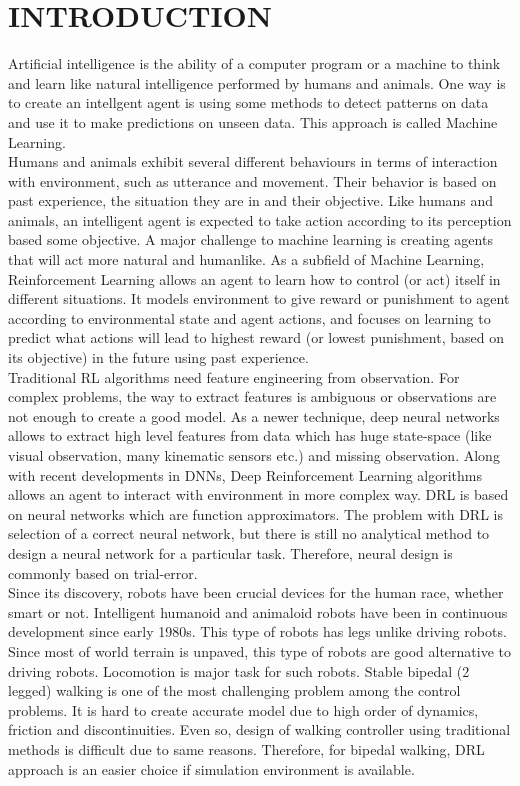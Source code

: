 \chapter{INTRODUCTION}
\label{chap:intro}
Artificial intelligence is the ability of a computer program or a machine to think and learn like natural intelligence performed by humans and animals.  One way is to create an intellgent agent is using some methods to detect patterns on data and use it to make predictions on unseen data. This approach is called Machine Learning.  \\
Humans and animals exhibit several different behaviours in terms of interaction with environment, such as utterance and movement. Their behavior is based on past experience, the situation they are in and their objective. Like humans and animals, an intelligent agent is expected to take action according to its perception based some objective. A major challenge to machine learning is creating agents that will act more natural and humanlike. As a subfield of Machine Learning, Reinforcement Learning allows an agent to learn how to control (or act) itself in different situations. It models environment to give reward or punishment to agent according to environmental state and agent actions, and focuses on learning to predict what actions will lead to highest reward (or lowest punishment, based on its objective) in the future using past experience. \\
Traditional RL algorithms need feature engineering from observation. For complex problems, the way to extract features is ambiguous or observations are not enough to create a good model. As a newer technique, deep neural networks allows to extract high level features from data which has huge state-space (like visual observation, many kinematic sensors etc.) and missing observation. Along with recent developments in DNNs, Deep Reinforcement Learning algorithms allows an agent to interact with environment in more complex way. DRL is based on neural networks which are function approximators. The problem with DRL is selection of a correct neural network, but there is still no analytical method to design a neural network for a particular task. Therefore, neural design is commonly based on trial-error. \\
Since its discovery, robots have been crucial devices for the human race, whether smart or not. Intelligent humanoid and animaloid robots have been in continuous development since early 1980s. This type of robots has legs unlike driving robots. Since most of world terrain is unpaved, this type of robots are good alternative to driving robots. Locomotion is major task for such robots. Stable bipedal (2 legged) walking is one of the most challenging problem among the control problems. It is hard to create accurate model due to high order of dynamics, friction and discontinuities. Even so, design of walking controller using traditional methods is difficult due to same reasons. Therefore, for bipedal walking, DRL approach is an easier choice if simulation environment is available. \\
